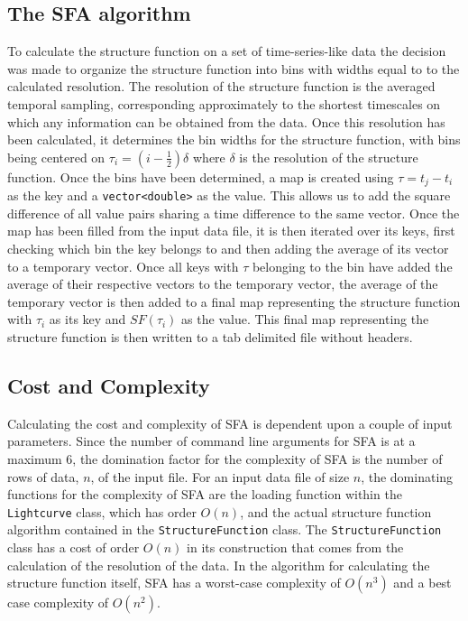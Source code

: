 \documentclass[12pt, oneside]{smuthesis}
\begin{document}
\subsection{\sc The SFA algorithm} \label{algorithm}

To calculate the structure function on a set of time-series-like data the decision was made to organize the structure function into bins with widths equal to to the calculated resolution. The resolution of the structure function is the averaged temporal sampling, corresponding approximately to the shortest timescales on which any information can be obtained from the data. Once this resolution has been calculated, it determines the bin widths for the structure function, with bins being centered on $\tau_{i}=(i - \frac{1}{2})\delta$ where $\delta$ is the resolution of the structure function. Once the bins have been determined, a map is created using $\tau=t_{j}-t_{i}$ as the key and a \verb|vector<double>| as the value. This allows us to add the square difference of all value pairs sharing a time difference to the same vector. Once the map has been filled from the input data file, it is then iterated over its keys, first checking which bin the key belongs to and then adding the average of its vector to a temporary vector. Once all keys with $\tau$ belonging to the bin have added the average of their respective vectors to the temporary vector, the average of the temporary vector is then added to a final map representing the structure function with $\tau_{i}$ as its key and $SF(\tau_{i})$ as the value. This final map representing the structure function is then written to a tab delimited file without headers.

\subsection{\sc Cost and Complexity} \label{costComplexity}

Calculating the cost and complexity of SFA is dependent upon a couple of input parameters. Since the number of command line arguments for SFA is at a maximum 6, the domination factor for the complexity of SFA is the number of rows of data, $n$, of the input file. For an input data file of size $n$, the dominating functions for the complexity of SFA are the loading function within the \verb|Lightcurve| class, which has order $O(n)$, and the actual structure function algorithm contained in the \verb|StructureFunction| class. The \verb|StructureFunction| class has a cost of order $O(n)$ in its construction that comes from the calculation of the resolution of the data. In the algorithm for calculating the structure function itself, SFA has a worst-case complexity of $O(n^{3})$ and a best case complexity of $O(n^{2})$.
\end{document}
